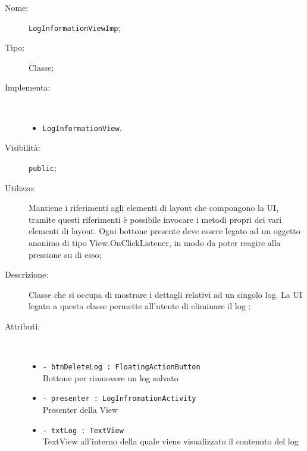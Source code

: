 \documentclass[../DefinizioneDiProdotto.tex]{subfiles}
\begin{document}
\begin{description}
	\item[Nome:] \texttt{LogInformationViewImp};
	\item[Tipo:] Classe;
	\item[Implementa:] \
	\begin{itemize}
		\item \texttt{LogInformationView}.
		
	\end{itemize}
	\item[Visibilità:] \texttt{public};
	\item[Utilizzo:] Mantiene i riferimenti agli elementi di layout che compongono la UI, tramite questi riferimenti è possibile invocare i metodi propri dei vari elementi di layout. Ogni bottone presente deve essere legato ad un oggetto anonimo di tipo View.OnClickListener, in modo da poter reagire alla pressione su di esso;
	\item[Descrizione:] Classe che si occupa di mostrare i dettagli relativi ad un singolo log. La UI legata a questa classe permette all'utente di eliminare il log ;
	\item[Attributi:] \
	\begin{itemize}
		\item \texttt{- btnDeleteLog : FloatingActionButton}\\
		Bottone per rimuovere un log salvato
		
		\item \texttt{- presenter : LogInfromationActivity}\\
		Presenter della View
		
		\item \texttt{- txtLog : TextView}\\
		TextView all'interno della quale viene visualizzato il contenuto del log
		

\end{itemize}
\end{description}
\end{document}

